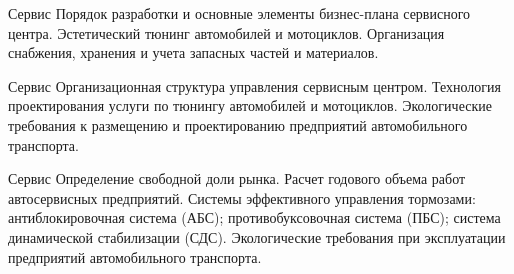 \documentclass[
	11pt,
	a4paper,
	]
	{article}
\begin{document}
\begin{minipage}[t][\miniH]{\miniL}\centering
	 {Сервис}
		{
			Порядок разработки и основные элементы бизнес-плана сервисного центра.
		}{
			Эстетический тюнинг автомобилей и мотоциклов.
		}{
			Организация снабжения, хранения и учета запасных частей и материалов.
		}
	\lowGE
\end{minipage}

\vfill



\begin{minipage}[t][\miniH]{\miniL}\centering
	 {Сервис}
		{
			Организационная структура управления сервисным центром.
		}{
			Технология проектирования услуги по тюнингу автомобилей и мотоциклов.
		}{
			Экологические требования к размещению и проектированию предприятий автомобильного транспорта.
		}
	\lowGE
\end{minipage}

\vfill



\begin{minipage}[t][\miniH]{\miniL}\centering
	 {Сервис}
		{
			Определение свободной доли рынка. Расчет годового объема работ автосервисных предприятий.
		}{
			Системы эффективного управления тормозами: антиблокировочная система (АБС); противобуксовочная система (ПБС); система динамической стабилизации (СДС).
		}{
			Экологические требования при эксплуатации предприятий автомобильного транспорта.
		}
	\lowGE
\end{minipage}



	
\end{document}
